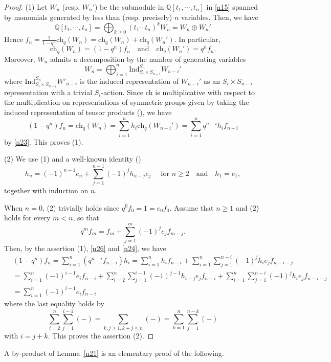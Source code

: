 \documentclass[11pt]{article}
\theoremstyle{definition}
\numberwithin{equation}{section}
\numberwithin{equation}{section}
\newcommand\QQ{\mathbb{Q}}
\newcommand\Ind{\mathrm{Ind} }
\newcommand\ch{\mathrm{ch} }
\newcommand{\aand}{\quad\text{and}\quad}
\newcommand\beq{\begin{equation}}
\newcommand\eeq{\end{equation}}
\begin{document}
\begin{proof}
	(1) Let $W_n$ (resp. $W_n'$) be the submodule in $\QQ[t_1,\cdots,t_n]$ in \eqref{n15} spanned by monomials generated by less than (resp. precisely) $n$ variables. Then, we have
	\[\QQ[t_1,\cdots,t_n]=\bigoplus_{k\geq0}(t_1\cdots t_n)^kW_n=W_n\oplus W_n'\] 
	Hence $f_n=\frac{1}{1-q^n}\ch_q (W_n)=\ch_q(W_n)+\ch_q(W_n')$. In particular,
	\beq \label{n23} \ch_q(W_n)=(1-q^n)f_n \aand \ch_q(W_n')=q^nf_n.\eeq
	Moreover, $W_n$ admits a decomposition by the number of generating variables
	\[W_n=\bigoplus_{i=1}^n\Ind^{S_n}_{S_i\times S_{n-i}}W_{n-i}'\]
	where $\Ind^{S_n}_{S_i\times S_{n-i}}W'_{n-i}$ is the induced representation of $W_{n-i}'$ as an $S_i\times S_{n-i}$ representation with a trivial $S_i$-action. Since $\ch$ is multiplicative with respect to the multiplication on representations of symmetric groups given by taking the induced representation of tensor products (\cite[I,~(7.3)]{Mac}), we have
	\[(1-q^n)f_n=\ch_q(W_n)=\sum_{i=1}^nh_i\ch_q(W_{n-i}')=\sum_{i=1}^n q^{n-i}h_if_{n-i}\]
	by \eqref{n23}. This proves (1).
	
	(2) We use (1) and a well-known identity (\cite[I,~(2.6)]{Mac})
	\beq\label{n24} h_n=(-1)^{n-1}e_n +\sum_{j=1}^{n-1}(-1)^jh_{n-j}e_j \quad \text{ for }n\geq2 \aand h_1=e_1,
	\eeq
	together with induction on $n$. 
	
	When $n=0$, (2) trivially holds since $q^0f_0=1=e_0f_0$. Assume that $n\geq 1$ and (2) holds for every $m<n$, so that
	\beq \label{n26} q^mf_m=f_m+\sum_{j=1}^m(-1)^je_jf_{m-j}.\eeq
	Then, by the assertion (1), \eqref{n26} and \eqref{n24}, we have
	\[\begin{split}
		&(1-q^n)f_n=\sum_{i=1}^n(q^{n-i}f_{n-i})h_i=\sum_{i=1}^nh_if_{n-i}+\sum_{i=1}^n\sum_{j=1}^{n-i}(-1)^jh_ie_jf_{n-i-j}\\
		&=\sum_{i=1}^n(-1)^{i-1}e_if_{n-i} +\sum_{i=2}^n\sum_{j=1}^{i-1}(-1)^{j-1}h_{i-j}e_jf_{n-i}+\sum_{i=1}^n\sum_{j=1}^{n-i}(-1)^jh_ie_jf_{n-i-j}\\
		&=\sum_{i=1}^n(-1)^{i-1}e_if_{n-i}
	\end{split}\]
	where the last equality holds by 
	\[\sum_{i=2}^n\sum_{j=1}^{i-1}(-)=\sum_{k,j\geq 1, k+j\leq n}(-)=\sum_{k=1}^n\sum_{j=1}^{n-k}(-)\]
	with $i=j+k$. This proves the assertion (2).
\end{proof}

A by-product of Lemma~\ref{n21} is an elementary proof of the following. 
\end{document}
